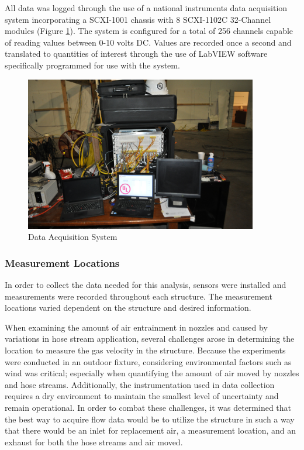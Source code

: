 \documentclass{article}
\begin{document}
All data was logged through the use of a national instruments data acquisition system incorporating a SCXI-1001 chassis with 8 SCXI-1102C 32-Channel modules (Figure \ref{fig:DataSystem}). The system is configured for a total of 256 channels capable of reading values between 0-10 volts DC. Values are recorded once a second and translated to quantities of interest through the use of LabVIEW software specifically programmed for use with the system.

\begin{figure}[H]
	\centering
	\includegraphics[width = 4in]{../0_Images/Instrumentation/DataSystem.jpg}
	\caption{Data Acquisition System}
	\label{fig:DataSystem}
\end{figure}

\clearpage

\subsubsection{Measurement Locations}

In order to collect the data needed for this analysis, sensors were installed and measurements were recorded throughout each structure. The measurement locations varied dependent on the structure and desired information.

When examining the amount of air entrainment in nozzles and caused by variations in hose stream application, several challenges arose in determining the location to measure the gas velocity in the structure. Because the experiments were conducted in an outdoor fixture, considering environmental factors such as wind was critical; especially when quantifying the amount of air moved by nozzles and hose streams. Additionally, the instrumentation used in data collection requires a dry environment to maintain the smallest level of uncertainty and remain operational. In order to combat these challenges, it was determined that the best way to acquire flow data would be to utilize the structure in such a way that there would be an inlet for replacement air, a measurement location, and an exhaust for both the hose streams and air moved. 
\end{document}
